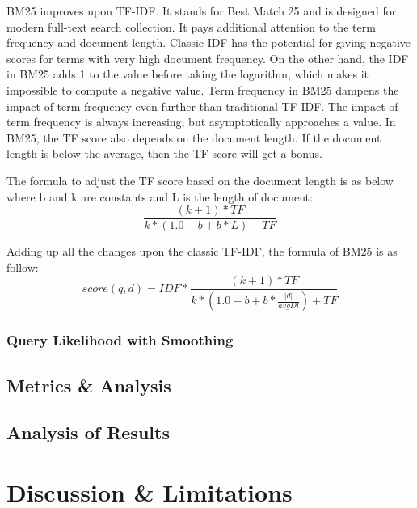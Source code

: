 BM25 improves upon TF-IDF. It stands for Best Match 25 and is designed for modern full-text search collection. It pays additional attention to the term frequency and document length. Classic IDF has the potential for giving negative scores for terms with very high document frequency. On the other hand, the IDF in BM25 adds 1 to the value before taking the logarithm, which makes it impossible to compute a negative value. Term frequency in BM25 dampens the impact of term frequency even further than traditional TF-IDF. The impact of term frequency is always increasing, but asymptotically approaches a value. In BM25, the TF score also depends on the document length. If the document length is below the average, then the TF score will get a bonus. 

The formula to adjust the TF score based on the document length is as below where b and k are constants and L is the length of document:
\[\frac{(k + 1) * TF}{k * (1.0 - b + b * L) + TF}\]

Adding up all the changes upon the classic TF-IDF, the formula of BM25 is as follow:
\[score(q,d)=IDF * \frac{(k + 1) * TF}{k * (1.0 - b + b * \frac{|d|}{avgDl}) + TF}
\]


\subsubsection{Query Likelihood with Smoothing} %
\label{ssub:query_likelihood_with_smoothing}




\subsection{Metrics \& Analysis} %
\label{sub:metrics_&_analysis}


\subsection{Analysis of Results} %
\label{sub:analysis_of_results}



\section{Discussion \& Limitations} %
\label{sec:discussion_&_limitations}

